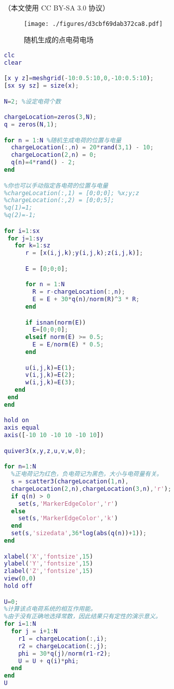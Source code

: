 

（本文使用 CC BY-SA 3.0 协议）
\begin{figure}[ht]
\centering
\texttt{[image: ./figures/d3cbf69dab372ca8.pdf]}
\caption{随机生成的点电荷电场} \label{fig_MLTEPD_1}
\end{figure}
\begin{lstlisting}[language=matlab]
clc
clear

[x y z]=meshgrid(-10:0.5:10,0,-10:0.5:10);
[sx sy sz] = size(x);

N=2; %设定电荷个数

chargeLocation=zeros(3,N);
q = zeros(N,1);

for n = 1:N %随机生成电荷的位置与电量
  chargeLocation(:,n) = 20*rand(3,1) - 10;
  chargeLocation(2,n) = 0;
  q(n)=4*rand() - 2;
end

%你也可以手动指定各电荷的位置与电量
%chargeLocation(:,1) = [0;0;0]; %x;y;z
%chargeLocation(:,2) = [0;0;5];
%q(1)=1;
%q(2)=-1;

for i=1:sx
 for j=1:sy
   for k=1:sz
      r = [x(i,j,k);y(i,j,k);z(i,j,k)];

      E = [0;0;0];

      for n = 1:N
        R = r-chargeLocation(:,n);
        E = E + 30*q(n)/norm(R)^3 * R;
      end

      if isnan(norm(E))
        E=[0;0;0];
      elseif norm(E) >= 0.5;
        E = E/norm(E) * 0.5;
      end

      u(i,j,k)=E(1);
      v(i,j,k)=E(2);
      w(i,j,k)=E(3);
   end
 end
end

hold on
axis equal
axis([-10 10 -10 10 -10 10])

quiver3(x,y,z,u,v,w,0);

for n=1:N
  %正电荷记为红色，负电荷记为黑色，大小与电荷量有关。
  s = scatter3(chargeLocation(1,n),
  chargeLocation(2,n),chargeLocation(3,n),'r');
  if q(n) > 0 
    set(s,'MarkerEdgeColor','r')
  else
    set(s,'MarkerEdgeColor','k')
  end
  set(s,'sizedata',36*log(abs(q(n))+1));
end

xlabel('X','fontsize',15)
ylabel('Y','fontsize',15)
zlabel('Z','fontsize',15)
view(0,0)
hold off

U=0; 
%计算该点电荷系统的相互作用能。
%由于没有正确地选择常数，因此结果只有定性的演示意义。
for i=1:N
  for j = i+1:N
    r1 = chargeLocation(:,i);
    r2 = chargeLocation(:,j);
    phi = 30*q(j)/norm(r1-r2);
    U = U + q(i)*phi;
  end
end
U
\end{lstlisting}
